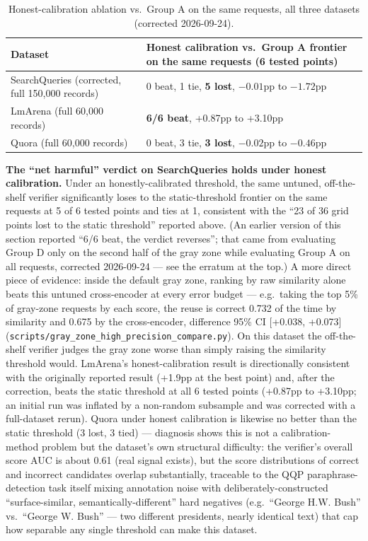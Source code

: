 \documentclass[11pt]{article}
\newenvironment{fittab}{\begin{lrbox}{\fittabbox}}{\end{lrbox}%
  \ifdim\wd\fittabbox>\linewidth\resizebox{\linewidth}{!}{\usebox{\fittabbox}}\else\usebox{\fittabbox}\fi}
\begin{document}
\begin{table}[h]
\centering
\small
\begin{fittab}\begin{tabular}{@{}lp{}@{}}
\toprule
\textbf{Dataset} & \textbf{Honest calibration vs.\ Group A frontier on the same requests (6 tested points)} \\
\midrule
SearchQueries (corrected, full 150,000 records) & 0 beat, 1 tie, \textbf{5 lost}, $-0.01$pp to $-1.72$pp \\
LmArena (full 60,000 records) & \textbf{6/6 beat}, +0.87pp to +3.10pp \\
Quora (full 60,000 records) & 0 beat, 3 tie, \textbf{3 lost}, $-0.02$pp to $-0.46$pp \\
\bottomrule
\end{tabular}\end{fittab}
\caption{Honest-calibration ablation vs.\ Group A on the same requests, all three datasets (corrected 2026-09-24).}
\end{table}

\textbf{The ``net harmful'' verdict on SearchQueries holds under honest calibration.} Under an honestly-calibrated threshold, the same untuned, off-the-shelf verifier significantly loses to the static-threshold frontier on the same requests at 5 of 6 tested points and ties at 1, consistent with the ``23 of 36 grid points lost to the static threshold'' reported above. (An earlier version of this section reported ``6/6 beat, the verdict reverses''; that came from evaluating Group D only on the second half of the gray zone while evaluating Group A on all requests, corrected 2026-09-24 --- see the erratum at the top.) A more direct piece of evidence: inside the default gray zone, ranking by raw similarity alone beats this untuned cross-encoder at every error budget --- e.g.\ taking the top 5\% of gray-zone requests by each score, the reuse is correct 0.732 of the time by similarity and 0.675 by the cross-encoder, difference 95\% CI [+0.038, +0.073] (\texttt{scripts/\allowbreak{}gray\_\allowbreak{}zone\_\allowbreak{}high\_\allowbreak{}precision\_\allowbreak{}compare.\allowbreak{}py}). On this dataset the off-the-shelf verifier judges the gray zone worse than simply raising the similarity threshold would. LmArena's honest-calibration result is directionally consistent with the originally reported result (+1.9pp at the best point) and, after the correction, beats the static threshold at all 6 tested points (+0.87pp to +3.10pp; an initial run was inflated by a non-random subsample and was corrected with a full-dataset rerun). Quora under honest calibration is likewise no better than the static threshold (3 lost, 3 tied) --- diagnosis shows this is not a calibration-method problem but the dataset's own structural difficulty: the verifier's overall score AUC is about 0.61 (real signal exists), but the score distributions of correct and incorrect candidates overlap substantially, traceable to the QQP paraphrase-detection task itself mixing annotation noise with deliberately-constructed ``surface-similar, semantically-different'' hard negatives (e.g.\ ``George H.W. Bush'' vs.\ ``George W. Bush'' --- two different presidents, nearly identical text) that cap how separable any single threshold can make this dataset.
\end{document}

